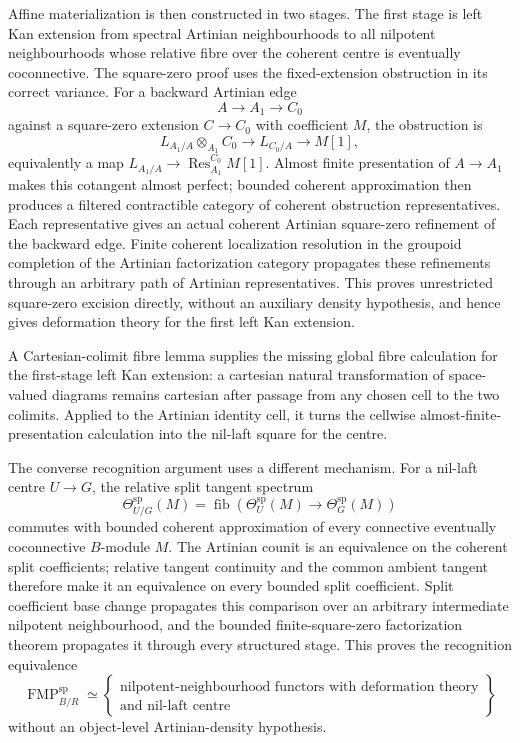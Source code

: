 Affine materialization is then constructed in two stages.  The first stage is
left Kan extension from spectral Artinian neighbourhoods to all nilpotent
neighbourhoods whose relative fibre over the coherent centre is eventually
coconnective.  The square-zero proof uses the fixed-extension obstruction in
its correct variance.  For a backward Artinian edge
\[
    A\longrightarrow A_1\longrightarrow C_0
\]
against a square-zero extension $C\to C_0$ with coefficient $M$, the
obstruction is
\[
\boxed{
    L_{A_1/A}\otimes_{A_1}C_0
    \longrightarrow L_{C_0/A}
    \longrightarrow M[1],}
\]
equivalently a map $L_{A_1/A}\to\operatorname{Res}_{A_1}^{C_0}M[1]$.
Almost finite presentation of $A\to A_1$ makes this cotangent almost perfect;
bounded coherent approximation then produces a filtered contractible
category of coherent obstruction representatives.  Each representative gives
an actual coherent Artinian square-zero refinement of the backward edge.
Finite coherent localization resolution in the groupoid completion of the Artinian
factorization category propagates these refinements through an arbitrary path
of Artinian representatives.  This proves unrestricted square-zero excision
directly, without an auxiliary density hypothesis, and hence gives
deformation theory for the first left Kan extension.

A Cartesian-colimit fibre lemma supplies the missing global fibre calculation
for the first-stage left Kan extension: a cartesian natural transformation of
space-valued diagrams remains cartesian after passage from any chosen cell to
the two colimits.  Applied to the Artinian identity cell, it turns the
cellwise almost-finite-presentation calculation into the nil-laft square for
the centre.

The converse recognition argument uses a different mechanism.  For a
nil-laft centre $U\to G$, the relative split tangent spectrum
\[
    \Theta_{U/G}^{\mathrm{sp}}(M)
    =
    \operatorname{fib}
    \left(
      \Theta_U^{\mathrm{sp}}(M)
      \to
      \Theta_G^{\mathrm{sp}}(M)
    \right)
\]
commutes with bounded coherent approximation of every connective eventually
coconnective $B$-module $M$.  The Artinian counit is an equivalence on the
coherent split coefficients; relative tangent continuity and the common
ambient tangent therefore make it an equivalence on every bounded split
coefficient.  Split coefficient base change propagates this comparison over
an arbitrary intermediate nilpotent neighbourhood, and the bounded
finite-square-zero factorization theorem propagates it through every
structured stage.  This proves the recognition equivalence
\[
\operatorname{FMP}^{\mathrm{sp}}_{B/R}
\simeq
\left\{
\begin{array}{c}
\text{nilpotent-neighbourhood functors with deformation theory}\\
\text{and nil-laft centre}
\end{array}
\right\}
\]
without an object-level Artinian-density hypothesis.

